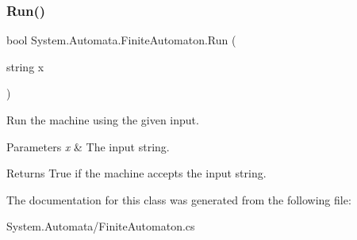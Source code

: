 \subsubsection{\texorpdfstring{Run()}{Run()}\hspace{0.1cm}{\footnotesize\ttfamily [2/2]}}
{\footnotesize\ttfamily bool System.\+Automata.\+Finite\+Automaton.\+Run (\begin{DoxyParamCaption}\item[{string}]{x }\end{DoxyParamCaption})}



Run the machine using the given input. 


\begin{DoxyParams}{Parameters}
{\em x} & The input string.\\
\hline
\end{DoxyParams}
\begin{DoxyReturn}{Returns}
True if the machine accepts the input string.
\end{DoxyReturn}


The documentation for this class was generated from the following file\+:\begin{DoxyCompactItemize}
\item 
System.\+Automata/Finite\+Automaton.\+cs\end{DoxyCompactItemize}
